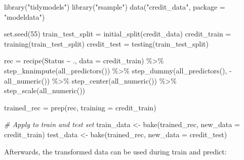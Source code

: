 \documentclass[
]{scrbook}
\newenvironment{Shaded}{\begin{snugshade}}{\end{snugshade}}
\newcommand{\AttributeTok}[1]{\textcolor[rgb]{0.77,0.63,0.00}{#1}}
\newcommand{\CommentTok}[1]{\textcolor[rgb]{0.56,0.35,0.01}{\textit{#1}}}
\newcommand{\DecValTok}[1]{\textcolor[rgb]{0.00,0.00,0.81}{#1}}
\newcommand{\FunctionTok}[1]{\textcolor[rgb]{0.00,0.00,0.00}{#1}}
\newcommand{\NormalTok}[1]{#1}
\newcommand{\OtherTok}[1]{\textcolor[rgb]{0.56,0.35,0.01}{#1}}
\newcommand{\SpecialCharTok}[1]{\textcolor[rgb]{0.00,0.00,0.00}{#1}}
\newcommand{\StringTok}[1]{\textcolor[rgb]{0.31,0.60,0.02}{#1}}
\renewenvironment{Shaded} {\begin{snugshade}\small} {\end{snugshade}}
\begin{document}
\begin{Shaded}
\begin{Highlighting}[]
\FunctionTok{library}\NormalTok{(}\StringTok{"tidymodels"}\NormalTok{)}
\FunctionTok{library}\NormalTok{(}\StringTok{"rsample"}\NormalTok{)}
\FunctionTok{data}\NormalTok{(}\StringTok{"credit\_data"}\NormalTok{, }\AttributeTok{package =} \StringTok{"modeldata"}\NormalTok{)}

\FunctionTok{set.seed}\NormalTok{(}\DecValTok{55}\NormalTok{)}
\NormalTok{train\_test\_split }\OtherTok{=} \FunctionTok{initial\_split}\NormalTok{(credit\_data)}
\NormalTok{credit\_train }\OtherTok{=} \FunctionTok{training}\NormalTok{(train\_test\_split)}
\NormalTok{credit\_test }\OtherTok{=} \FunctionTok{testing}\NormalTok{(train\_test\_split)}

\NormalTok{rec }\OtherTok{=} \FunctionTok{recipe}\NormalTok{(Status }\SpecialCharTok{\textasciitilde{}}\NormalTok{ ., }\AttributeTok{data =}\NormalTok{ credit\_train) }\SpecialCharTok{\%\textgreater{}\%}
  \FunctionTok{step\_knnimpute}\NormalTok{(}\FunctionTok{all\_predictors}\NormalTok{()) }\SpecialCharTok{\%\textgreater{}\%}
  \FunctionTok{step\_dummy}\NormalTok{(}\FunctionTok{all\_predictors}\NormalTok{(), }\SpecialCharTok{{-}}\FunctionTok{all\_numeric}\NormalTok{()) }\SpecialCharTok{\%\textgreater{}\%}
  \FunctionTok{step\_center}\NormalTok{(}\FunctionTok{all\_numeric}\NormalTok{()) }\SpecialCharTok{\%\textgreater{}\%}
  \FunctionTok{step\_scale}\NormalTok{(}\FunctionTok{all\_numeric}\NormalTok{())}

\NormalTok{trained\_rec }\OtherTok{=} \FunctionTok{prep}\NormalTok{(rec, }\AttributeTok{training =}\NormalTok{ credit\_train)}

\CommentTok{\# Apply to train and test set}
\NormalTok{train\_data }\OtherTok{\textless{}{-}} \FunctionTok{bake}\NormalTok{(trained\_rec, }\AttributeTok{new\_data =}\NormalTok{ credit\_train)}
\NormalTok{test\_data  }\OtherTok{\textless{}{-}} \FunctionTok{bake}\NormalTok{(trained\_rec, }\AttributeTok{new\_data =}\NormalTok{ credit\_test)}
\end{Highlighting}
\end{Shaded}

Afterwards, the transformed data can be used during train and predict:
\end{document}
